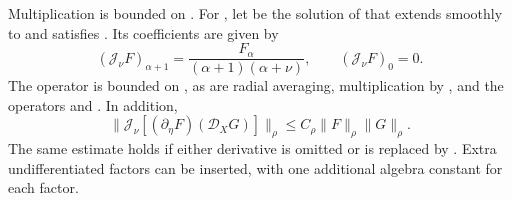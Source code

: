 \begin{lemma}\label{lem:B.1}
Multiplication is bounded on . For
, let  be the solution
 of
 that extends smoothly to
 and satisfies . Its coefficients are given by
\begin{equation}
  (\mathcal J_\nu F)_{\alpha+1}
  =\frac{F_\alpha}{(\alpha+1)(\alpha+\nu)},
  \qquad (\mathcal J_\nu F)_0=0.
  \tag{B.5}\label{eq:B.5}
\end{equation}
The operator  is bounded on
, as are radial averaging, multiplication by
, and the operators  and
. In addition,
\begin{equation}
  \bigl\lVert\mathcal J_\nu[(\partial_\eta F)(\mathcal D_XG)]\bigr\rVert_\rho
  \leq C_\rho\lVert F\rVert_\rho\lVert G\rVert_\rho.
  \tag{B.6}\label{eq:B.6}
\end{equation}
The same estimate holds if either derivative is omitted or  is replaced by
. Extra undifferentiated factors can be inserted, with one
additional algebra constant for each factor.
\end{lemma}

